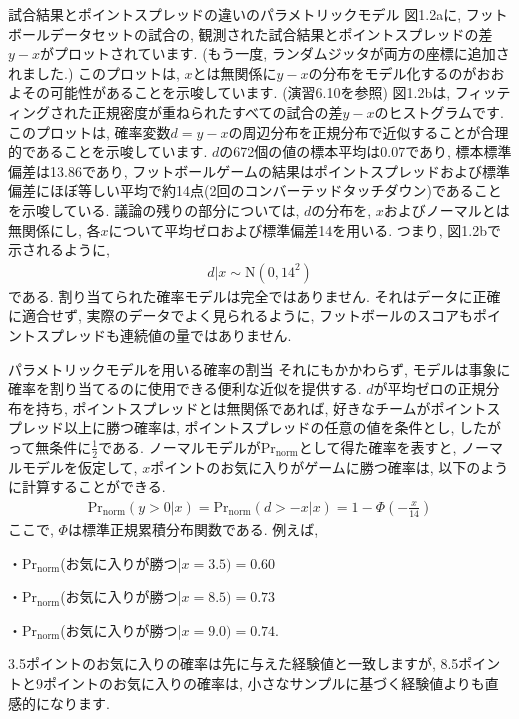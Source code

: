 \documentclass[10pt,dvipdfmx,a4]{beamer}
\newcommand{\eqn}[1]{\begin{align*}#1\end{align*}}
\begin{document}
\begin{frame}{試合結果とポイントスプレッドの違いのパラメトリックモデル}
図1.2aに, フットボールデータセットの試合の, 観測された試合結果とポイントスプレッドの差$y-x$がプロットされています.
(もう一度, ランダムジッタが両方の座標に追加されました.)
このプロットは, $x$とは無関係に$y-x$の分布をモデル化するのがおおよその可能性があることを示唆しています.
(演習6.10を参照)
図1.2bは, フィッティングされた正規密度が重ねられたすべての試合の差$y-x$のヒストグラムです.
このプロットは, 確率変数$d=y-x$の周辺分布を正規分布で近似することが合理的であることを示唆しています.
$d$の672個の値の標本平均は0.07であり, 標本標準偏差は13.86であり, フットボールゲームの結果はポイントスプレッドおよび標準偏差にほぼ等しい平均で約14点(2回のコンバーテッドタッチダウン)であることを示唆している.
議論の残りの部分については, $d$の分布を, $x$およびノーマルとは無関係にし, 各$x$について平均ゼロおよび標準偏差14を用いる.
つまり, 図1.2bで示されるように, 
\eqn{ d|x \sim \text{N}(0,14^2)}
である.
割り当てられた確率モデルは完全ではありません.
それはデータに正確に適合せず, 実際のデータでよく見られるように, フットボールのスコアもポイントスプレッドも連続値の量ではありません.
\end{frame}


\begin{frame}{パラメトリックモデルを用いる確率の割当}
それにもかかわらず, モデルは事象に確率を割り当てるのに使用できる便利な近似を提供する.
$d$が平均ゼロの正規分布を持ち, ポイントスプレッドとは無関係であれば, 好きなチームがポイントスプレッド以上に勝つ確率は, ポイントスプレッドの任意の値を条件とし, したがって無条件に$\tfrac{1}{2}$である.
ノーマルモデルが$\text{Pr}_{\text{norm}}$として得た確率を表すと, ノーマルモデルを仮定して, $x$ポイントのお気に入りがゲームに勝つ確率は, 以下のように計算することができる.
\eqn{\text{Pr}_{\text{norm}}(y>0|x)=\text{Pr}_{\text{norm}}(d>-x|x)=1-\Phi\left(-\frac{x}{14}\right)}
ここで, $\Phi$は標準正規累積分布関数である.
例えば,

・$\text{Pr}_{\text{norm}}$(お気に入りが勝つ|$x=3.5)=0.60$

・$\text{Pr}_{\text{norm}}$(お気に入りが勝つ|$x=8.5)=0.73$

・$\text{Pr}_{\text{norm}}$(お気に入りが勝つ|$x=9.0)=0.74$.

3.5ポイントのお気に入りの確率は先に与えた経験値と一致しますが, 8.5ポイントと9ポイントのお気に入りの確率は, 小さなサンプルに基づく経験値よりも直感的になります.
\end{frame}
\end{document}
